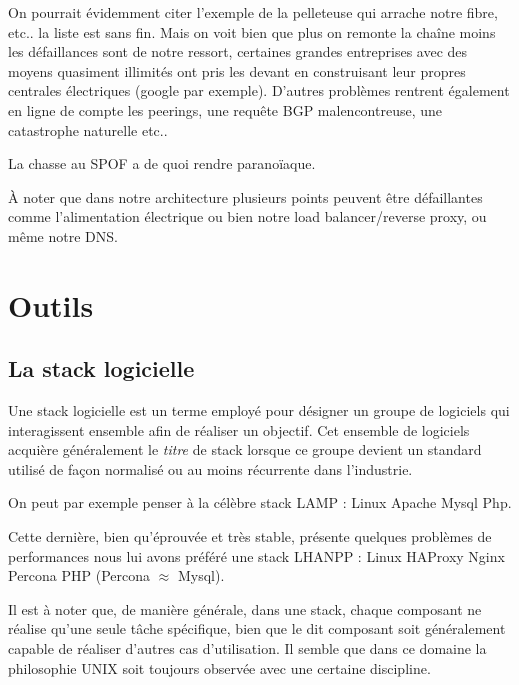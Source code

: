 \documentclass[a4paper,10pt,one side,titlepage]{report}
\begin{document}
On pourrait évidemment citer l'exemple de la pelleteuse qui arrache notre fibre, etc..
la liste est sans fin. Mais on voit bien que plus on remonte la chaîne moins les 
défaillances sont de notre ressort, certaines grandes entreprises avec des moyens 
quasiment illimités ont pris les devant en construisant leur propres centrales 
électriques (google par exemple). D'autres problèmes rentrent également en ligne 
de compte les peerings, une requête \gls{BGP} malencontreuse, une catastrophe naturelle etc..

La chasse au SPOF a de quoi rendre paranoïaque. 

À noter que dans notre architecture plusieurs points peuvent être défaillantes comme 
l'alimentation électrique ou bien notre \gls{load balancer}/reverse proxy, ou même 
notre DNS.




\chapter{Outils}


\section{La stack logicielle}
Une stack logicielle est un terme employé pour désigner un groupe de logiciels 
qui interagissent ensemble afin de réaliser un objectif. Cet ensemble de logiciels 
acquière généralement le \textit{titre} de stack lorsque ce groupe devient un 
standard utilisé de façon normalisé ou au moins récurrente dans l'industrie.

On peut par exemple penser à la célèbre stack LAMP : Linux Apache Mysql Php.

Cette dernière, bien qu'éprouvée et très stable, présente quelques problèmes de 
performances nous lui avons préféré une stack LHANPP : Linux HAProxy Nginx Percona PHP
(Percona $ \approx $ Mysql).

Il est à noter que, de manière générale, dans une stack, chaque composant ne réalise 
qu'une seule tâche spécifique, bien que le dit composant soit généralement capable de
réaliser d'autres cas d'utilisation. Il semble que dans ce domaine la philosophie 
UNIX soit toujours observée avec une certaine discipline.
\end{document}
